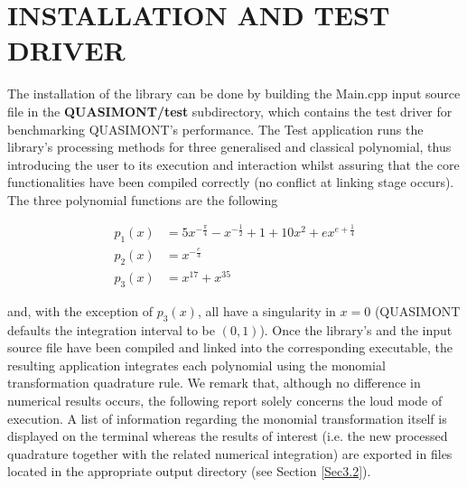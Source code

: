 \documentclass[a4paper, twosided]{book}
\begin{document}
\section[Installation and test driver]{\changefont INSTALLATION AND TEST DRIVER}\label{Sec2.4}

\noindent
The installation of the library can be done by building the \colorbox{poliGrayBlue}{Main.cpp} input source file in the \colorbox{poliGrayBlue}{\textbf{QUASIMONT/test}} subdirectory, which contains the test driver for benchmarking QUASIMONT's performance. The \colorbox{poliGrayBlue}{Test} application  runs the library's processing methods for three generalised and classical polynomial, thus introducing the user to its execution and interaction whilst assuring that the core functionalities have been compiled correctly (no conflict at linking stage occurs). The three polynomial functions are the following

\begin{equation*}
    \begin{split}
        p_1(x) & = 5x^{-\frac{\pi}{4}}-x^{-\frac{1}{2}}+1+10x^{2}+ex^{e+\frac{1}{4}} \\
        p_2(x) & = x^{-\frac{e}{3}} \\
        p_3(x) & = x^{17} + x^{35}
    \end{split}
\end{equation*}

\noindent
and, with the exception of $p_3(x)$, all have a singularity in $x=0$ (QUASIMONT defaults the integration interval to be $(0,1)$). Once the library's and the input source file have been compiled and linked into the corresponding executable, the resulting application integrates each polynomial using the monomial transformation quadrature rule. We remark that, although no difference in numerical results occurs, the following report solely concerns the loud mode of execution. A list of information regarding the monomial transformation itself is displayed on the terminal whereas the results of interest (i.e. the new processed quadrature together with the related numerical integration) \color{black} are exported in files located in the appropriate output directory (see Section \ref{Sec3.2}). 
\end{document}
